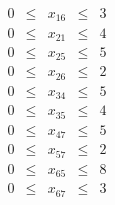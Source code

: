 \documentclass[a4paper]{scrartcl}
\begin{document}
\begin{enumerate}[label=\bfseries\arabic*.]
\begin{enumerate}
\begin{equation}
\begin{gathered}
\begin{array}{rcrcr}
                            0 & \leq & x_{16} & \leq & 3 \\
                            0 & \leq & x_{21} & \leq & 4 \\
                            0 & \leq & x_{25} & \leq & 5 \\
                            0 & \leq & x_{26} & \leq & 2 \\
                            0 & \leq & x_{34} & \leq & 5 \\
                            0 & \leq & x_{35} & \leq & 4 \\
                            0 & \leq & x_{47} & \leq & 5 \\
                            0 & \leq & x_{57} & \leq & 2 \\
                            0 & \leq & x_{65} & \leq & 8 \\
                            0 & \leq & x_{67} & \leq & 3
                        \end{array}
                    \end{gathered}
                \end{equation}


\end{enumerate}
\end{enumerate}
\end{document}
